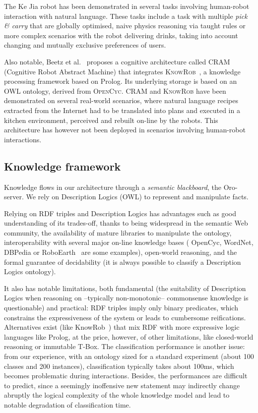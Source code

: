\documentclass[preprint,3p,times]{elsarticle}
\begin{document}
The Ke Jia robot has been demonstrated in several tasks involving human-robot
interaction with natural language. These tasks include a task with multiple
\emph{pick \& carry} that are globally optimised, naive physics reasoning via
taught rules or more complex scenarios with the robot delivering drinks, taking
into account changing and mutually exclusive preferences of users.

Also notable, Beetz et al.~\cite{Beetz2010} proposes a cognitive architecture
called \textsc{CRAM} (Cognitive Robot Abstract Machine) that integrates
\textsc{KnowRob}~\cite{Tenorth2009a}, a knowledge processing framework based on
Prolog. Its underlying storage is based on an OWL ontology, derived from
\textsc{OpenCyc}. \textsc{CRAM} and \textsc{KnowRob} have been demonstrated on
several real-world scenarios, where natural language recipes extracted from the
Internet had to be translated into plans and executed in a kitchen environment,
perceived and rebuilt on-line by the robots. This architecture has however not
been deployed in scenarios involving human-robot interactions.

\subsection{Knowledge framework}
\label{krs-discussion}

Knowledge flows in our architecture through a \emph{semantic blackboard}, the
{\sc Oro}-server. We rely on Description Logics (OWL) to represent and
manipulate facts.

Relying on RDF triples and Description Logics has advantages such as good
understanding of its trades-off, thanks to being widespread in the semantic Web
community, the availability of mature libraries to manipulate the ontology,
interoperability with several major on-line knowledge bases ({\sc
OpenCyc}, {\sc WordNet}, {\sc DBPedia} or {\sc RoboEarth}~\cite{Waibel2011} are
some examples), open-world reasoning, and the formal guarantee of decidability
(it is always possible to classify a Description Logics ontology).

It also has notable limitations, both fundamental (the suitability of
Description Logics when reasoning on --typically non-monotonic-- commonsense
knowledge is questionable) and practical: RDF triples imply only binary
predicates, which constrains the expressiveness of the system or leads to
cumbersome reifications. Alternatives exist (like {\sc
KnowRob}~\cite{Tenorth2009a}) that mix RDF with more expressive logic languages
like {\sc Prolog}, at the price, however, of other limitations, like
closed-world reasoning or immutable T-Box. The classification performance is
another issue: from our experience, with an ontology sized for a standard
experiment (about 100 classes and 200 instances), classification typically
takes about 100ms, which becomes problematic during interactions.  Besides, the
performances are difficult to predict, since a seemingly inoffensive new
statement may indirectly change abruptly the logical complexity of the whole
knowledge model and lead to notable degradation of classification time.
\end{document}
